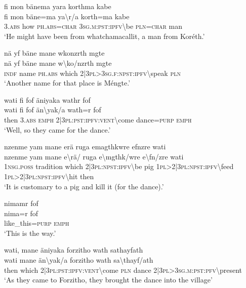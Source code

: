 \ea\label{ex:11:a2492}
fi mon bänema yara korthma kabe\\
\gll fi	mon	bäne=ma	ya{\textbackslash}r/a	korth=ma	kabe\\
     3.\textsc{abs}	how	\textsc{ph}.\textsc{abs}=\textsc{char}	3\textsc{sg}.\textsc{m}:\textsc{pst}:\textsc{ipfv}{\textbackslash}be	\textsc{pln}=\textsc{char}	man\\
\glt `He might have been from whatchamacallit, a man from Koréth.'
\z

\ea\label{ex:11:a2494}
nä yf bäne mane wkonzrth mgte\\
\gll nä	yf	bäne	mane	w{\textbackslash}ko/nzrth	mgte\\
     \textsc{indf}	name	\textsc{ph}.\textsc{abs}	which	2|3\textsc{pl}>3\textsc{sg}.\textsc{f}:\textsc{npst}:\textsc{ipfv}{\textbackslash}speak	\textsc{pln}\\
\glt `Another name for that place is Méngte.'
\z

\ea\label{ex:11:a2495}
wati fi fof äniyaka wathr fof\\
\gll wati	fi	fof	än{\textbackslash}yak/a	wath=r	fof\\
     then	3.\textsc{abs}	\textsc{emph}	2|3\textsc{pl}:\textsc{pst}:\textsc{ipfv}:\textsc{vent}{\textbackslash}come	dance=\textsc{purp}	\textsc{emph}\\
\glt `Well, so they came for the dance.'
\z

\ea\label{ex:11:a2497}
nzenme yam mane erä ruga emagthkwre efnzre wati\\
\gll nzenme	yam	mane	e{\textbackslash}rä/	ruga	e{\textbackslash}mgthk/wre	e{\textbackslash}fn/zre	wati\\
     1\textsc{nsg}.\textsc{poss}	tradition	which	2|3\textsc{pl}:\textsc{npst}:\textsc{ipfv}{\textbackslash}be	pig	1\textsc{pl}>2|3\textsc{pl}:\textsc{npst}:\textsc{ipfv}{\textbackslash}feed	1\textsc{pl}>2|3\textsc{pl}:\textsc{npst}:\textsc{ipfv}{\textbackslash}hit	then\\
\glt `It is customary to a pig and kill it (for the dance).'
\z

\ea\label{ex:11:a2498}
nimamr fof\\
\gll nima=r	fof\\
     like\_this=\textsc{purp}	\textsc{emph}\\
\glt `This is the way.'
\z

\ea\label{ex:11:a2499}
wati, mane äniyaka forzitho wath sathayfath\\
\gll wati	mane	än{\textbackslash}yak/a	forzitho	wath	sa{\textbackslash}thayf/ath\\
     then	which	2|3\textsc{pl}:\textsc{pst}:\textsc{ipfv}:\textsc{vent}{\textbackslash}come	\textsc{pln}	dance	2|3\textsc{pl}>3\textsc{sg}.\textsc{m}:\textsc{pst}:\textsc{pfv}{\textbackslash}present\\
\glt `As they came to Forzitho, they brought the dance into the village'
\z

